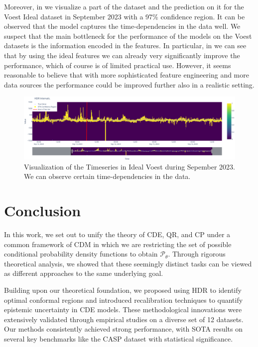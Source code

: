 Moreover, in  we visualize a part of the dataset and the prediction on it for the Voest Ideal dataset in September 2023 with a 97\% confidence region. It can be observed that the model captures the time-dependencies in the data well. We suspect that the main bottleneck for the performance of the models on the Voest datasets is the information encoded in the features. In particular, in  we can see that by using the ideal features we can already very significantly improve the performance, which of course is of limited practical use. However, it seems reasonable to believe that with more sophisticated feature engineering and more data sources the performance could be improved further also in a realistic setting.

\begin{figure}
    \centering
    \includegraphics[width=1\textwidth]{resources/voest_ideal_test_set.png}
    \caption[Visualization of the Timeseries in Ideal Voest]{Visualization of the Timeseries in Ideal Voest during Sepember 2023. We can observe certain time-dependencies in the data.}\label{fig:voest_ideal_test_set}
\end{figure}

\chapter{Conclusion}\label{chap:conclusion}

In this work, we set out to unify the theory of CDE, QR, and CP under a common framework of CDM in which we are restricting the set of possible conditional probability density functions to obtain $\mathscr{P}_\theta$. Through rigorous theoretical analysis, we showed that these seemingly distinct tasks can be viewed as different approaches to the same underlying goal.

Building upon our theoretical foundation, we proposed using HDR to identify optimal conformal regions and introduced recalibration techniques to quantify epistemic uncertainty in CDE models. These methodological innovations were extensively validated through empirical studies on a diverse set of 12 datasets. Our methods consistently achieved strong performance, with SOTA results on several key benchmarks like the CASP dataset with statistical significance.

